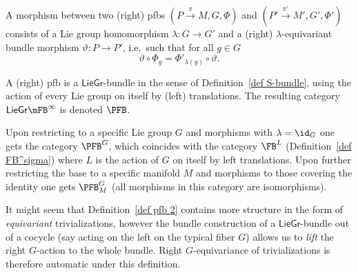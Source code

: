 

\begin{defn}
    A morphism between two (right) \glspl{pfb} $(P\overset{\pi}{\to}M,G,\Phi)$ and $(P'\overset{\pi'}{\to}M',G',\Phi')$ consists of a Lie group homomorphism $\lambda:G\to G'$ and a (right) $\lambda$-equivariant bundle morphism $\vartheta:P\to P'$, i.e.\ such that for all $g\in G$
    \[\vartheta\circ \Phi_{g}=\Phi'_{\lambda(g)}\circ \vartheta.\]
\end{defn}

\begin{defn}\label{def pfb 3}
    A (right) \gls{pfb} is a $\mathsf{LieGr}$-bundle in the sense of Definition~\ref{def S-bundle}, using the action of every Lie group on itself by (left) translations. The resulting category $\mathsf{LieGr}\mFB^\infty$ is denoted $\PFB$. 
    
    Upon restricting to a specific Lie group $G$ and morphisms with $\lambda=\id_G$ one gets the category $\PFB^G$, which coincides with the category $\FB^L$ (Definition~\ref{def FB^sigma}) where $L$ is the action of $G$ on itself by left translations. Upon further restricting the base to a specific manifold $M$ and morphisms to those covering the identity one gets $\PFB^G_M$ (all morphisms in this category are isomorphisms).
\end{defn}

It might seem that Definition~\ref{def pfb 2} contains more structure in the form of \emph{equivariant} trivializations, however the bundle construction of a $\mathsf{LieGr}$-bundle out of a cocycle (say acting on the left on the typical fiber $G$) allows us to \emph{lift} the right $G$-action to the whole bundle. Right $G$-equivariance of trivializations is therefore automatic under this definition.


